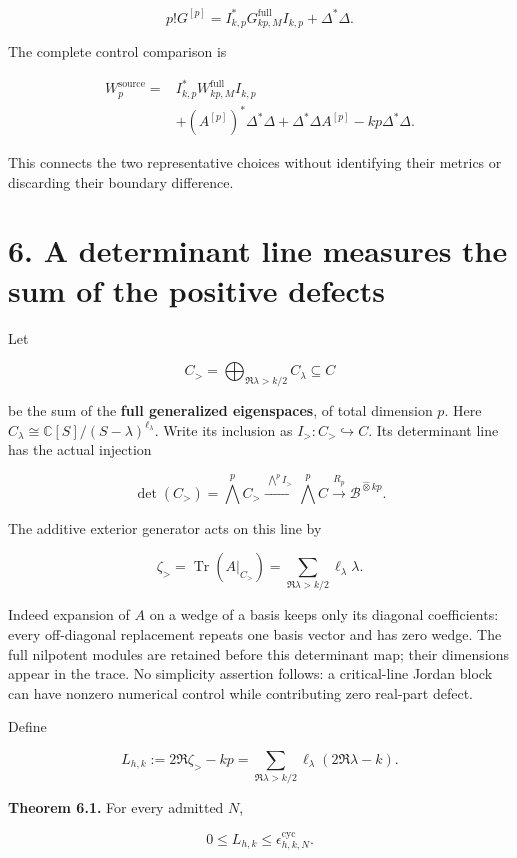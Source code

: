 \documentclass[
  11pt,
]{article}
\begin{document}
\[
\boxed{
p!G^{[p]}=I_{k,p}^*G_{kp,M}^{\mathrm{full}}I_{k,p}+\Delta^*\Delta.
}
\]

The complete control comparison is

\[
\begin{aligned}
W_p^{\mathrm{source}}={}&I_{k,p}^*W_{kp,M}^{\mathrm{full}}I_{k,p}\\
&+(A^{[p]})^*\Delta^*\Delta+\Delta^*\Delta A^{[p]}-kp\Delta^*\Delta.
\end{aligned}
\]

This connects the two representative choices without identifying their
metrics or discarding their boundary difference.

\section{6. A determinant line measures the sum of the positive
defects}\label{a-determinant-line-measures-the-sum-of-the-positive-defects}

Let

\[
C_{>}=\bigoplus_{\Re\lambda>k/2}C_\lambda\subseteq C
\]

be the sum of the \textbf{full generalized eigenspaces}, of total
dimension \(p\). Here
\(C_\lambda\cong\mathbb C[S]/(S-\lambda)^{\ell_\lambda}\). Write its
inclusion as \(I_{>}:C_{>}\hookrightarrow C\). Its determinant line has
the actual injection

\[
\det(C_{>})=\bigwedge^p C_{>}
\xrightarrow{\,\bigwedge^p I_{>}\,}
\bigwedge^p C
\xrightarrow{R_p}
\mathscr B^{\widehat\otimes kp}.
\]

The additive exterior generator acts on this line by

\[
\zeta_{>}=\operatorname{Tr}(A|_{C_{>}})
=\sum_{\Re\lambda>k/2}\ell_\lambda\lambda.
\]

Indeed expansion of \(A\) on a wedge of a basis keeps only its diagonal
coefficients: every off-diagonal replacement repeats one basis vector
and has zero wedge. The full nilpotent modules are retained before this
determinant map; their dimensions appear in the trace. No simplicity
assertion follows: a critical-line Jordan block can have nonzero
numerical control while contributing zero real-part defect.

Define

\[
\boxed{
L_{h,k}:=2\Re\zeta_{>}-kp
=\sum_{\Re\lambda>k/2}\ell_\lambda(2\Re\lambda-k).
}
\]

\textbf{Theorem 6.1.} For every admitted \(N\),

\[
\boxed{0\leq L_{h,k}\leq\epsilon_{h,k,N}^{\mathrm{cyc}}.}
\]
\end{document}
